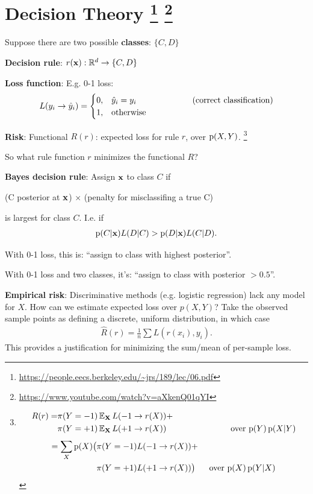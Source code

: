 \documentclass[12pt]{article}
\begin{document}
\newpage
\section*{Decision Theory
  \footnote{\url{https://people.eecs.berkeley.edu/~jrs/189/lec/06.pdf}}
  \footnote{\url{https://www.youtube.com/watch?v=aXkenQ01qYI}}
}

Suppose there are two possible \textbf{classes}: $\{C, D\}$

\textbf{Decision rule}: $r(\mathbf x): \mathbb{R}^d \to \{C, D\}$

\textbf{Loss function}: E.g. 0-1 loss:
\begin{align*}
  L(y_i \to \hat y_i) =
  \begin{cases}
    0, & \hat y_i = y_i ~~~~~~~~~~~~~~~~~~~~\text{(correct classification)}\\
    1, & \text{otherwise}
  \end{cases}
\end{align*}

\textbf{Risk}: Functional $R(r)$: expected loss for rule $r$, over $\operatorname{\text{p}}(X, Y)$.
\footnote{
\begin{align*}
  R(r) = &\pi(Y=-1)\operatorname{\mathbb{E}}_\mathbf X L(-1 \to r(X)) + \\
         &\pi(Y=+1)\operatorname{\mathbb{E}}_\mathbf X L(+1 \to r(X))~~~~~~~~~~~~~~~~~~~~~~~\text{over $\operatorname{\text{p}}(Y)\operatorname{\text{p}}(X|Y)$}
\end{align*}
\begin{align*}
  = \sum_X \operatorname{\text{p}}(X)\big(&\pi(Y=-1)L(-1 \to r(X)) + \\
                     &\pi(Y=+1)L(+1 \to r(X))\big)~~~~~\text{over $\operatorname{\text{p}}(X)\operatorname{\text{p}}(Y|X)$}
\end{align*}
}

So what rule function $r$ minimizes the functional $R$?

\textbf{Bayes decision rule}: Assign $\mathbf x$ to class $C$ if

\begin{center}
(C posterior at $\mathbf x$) $\times$ (penalty for misclassifing a true C)
\end{center}

is largest for class $C$. I.e. if
\begin{align*}
  \operatorname{\text{p}}(C|\mathbf x)L(D|C) > \operatorname{\text{p}}(D|\mathbf x)L(C|D).
\end{align*}

With 0-1 loss, this is: ``assign to class with highest posterior''.

With 0-1 loss and two classes, it's: ``assign to class with posterior $> 0.5$''.

\textbf{Empirical risk}: Discriminative methods (e.g. logistic regression) lack
any model for $X$. How can we estimate expected loss over $p(X,Y)$? Take the
observed sample points as defining a discrete, uniform distribution, in which
case
\begin{align*}
  \hat R(r) = \frac{1}{n}\sum L(r(x_i), y_i).
\end{align*}
This provides a justification for minimizing the sum/mean of per-sample loss.
\end{document}
